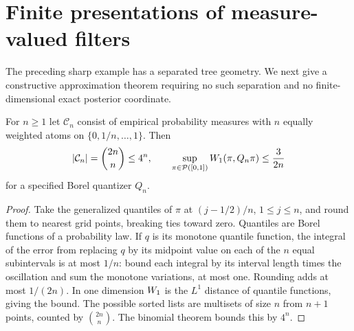 \section{Finite presentations of measure-valued filters}\label{sec:v7-measure}
The preceding sharp example has a separated tree geometry. We next give
a constructive approximation theorem requiring no such separation and
no finite-dimensional exact posterior coordinate.

\begin{lemma}\label{lem:v7-wasserstein-net}
For $n\ge1$ let $\mathcal C_n$ consist of empirical probability measures
with $n$ equally weighted atoms on $\{0,1/n,\ldots,1\}$. Then
\begin{equation}
 |\mathcal C_n|=\binom{2n}{n}\le4^n,
 \qquad\sup_{\pi\in\mathcal P([0,1])}W_1(\pi,Q_n\pi)
                              \le\frac{3}{2n}         \label{eq:v7-measure-net}
\end{equation}
for a specified Borel quantizer $Q_n$.
\end{lemma}
\begin{proof}
Take the generalized quantiles of $\pi$ at $(j-1/2)/n$, $1\le j\le n$,
and round them to nearest grid points, breaking ties toward zero.
Quantiles are Borel functions of a probability law. If $q$ is its
monotone quantile function, the integral of the error from replacing
$q$ by its midpoint value on each of the $n$ equal subintervals is at
most $1/n$: bound each integral by its interval length times the
oscillation and sum the monotone variations, at most one. Rounding
adds at most $1/(2n)$. In one dimension $W_1$ is the $L^1$ distance
of quantile functions, giving the bound. The possible sorted lists are
multisets of size $n$ from $n+1$ points, counted by $\binom{2n}{n}$.
The binomial theorem bounds this by $4^n$.
\end{proof}

